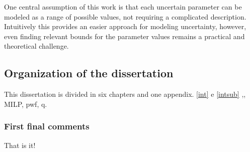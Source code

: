 One central assumption of this work is that each uncertain parameter can be modeled as a range of possible values, not requiring a complicated description. Intuitively this provides an easier approach for modeling uncertainty, however, even finding relevant bounds for the parameter values remains a practical and theoretical challenge.
%
\subsection{Organization of the dissertation}\label{intsub}
%
This dissertation is divided in six chapters and one appendix.
\autoref{int} e \autoref{intsub}
,, \gls{MILP}, \gls{pwf}, \gls{q}.
\subsubsection{First final comments}
That is it!
% 
% 
% 
% 
% 
